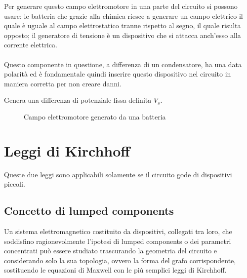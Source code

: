 Per generare questo campo elettromotore in una parte del circuito si possono usare: le batteria che grazie alla chimica riesce a generare un campo elettrico il quale è uguale al campo elettrostatico tranne rispetto al segno, il quale risulta opposto; il generatore di tensione è un dispositivo che si attacca anch'esso alla corrente elettrica.

\paragraph{}
Questo componente in questione, a differenza di un condensatore, ha una data polarità ed è fondamentale quindi inserire questo dispositivo nel circuito in maniera corretta per non creare danni.

Genera una differenza di potenziale fissa definita $V_s$.

\begin{figure}
    \centering
    \caption{Campo elettromotore generato da una batteria}
    \label{fig:campoElettromotoreBatteria}
\end{figure}




\section{Leggi di Kirchhoff}
Queste due leggi sono applicabili solamente se il circuito gode di dispositivi piccoli.

\subsection{Concetto di lumped components}
Un sistema elettromagnetico costituito da dispositivi, collegati tra loro, che soddisfino ragionevolmente l'ipotesi di lumped components o dei parametri concentrati può essere studiato trascurando la geometria del circuito e considerando solo la sua topologia, ovvero la forma del grafo corrispondente, sostituendo le equazioni di Maxwell con le più semplici leggi di Kirchhoff.

